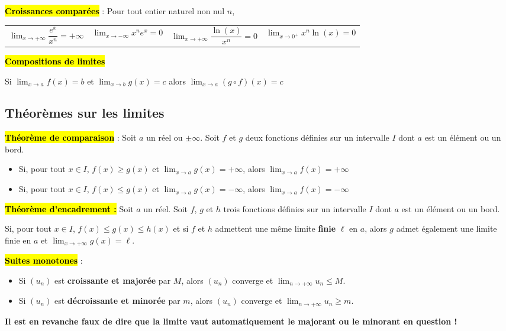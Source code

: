 \documentclass[10pt,fleqn, openany, landscape, twocolumn]{book} %
\begin{document}
\hl{\textbf{Croissances comparées}} : Pour tout entier naturel non nul $n$,

\begin{tabularx}{\linewidth}{XXXX}
$\displaystyle\lim_{x\to + \infty}\dfrac{e^x}{x^n}=+\infty$ & $\displaystyle\lim_{x\to - \infty}x^ne^x=0$ & $\displaystyle\lim_{x\to + \infty}\dfrac{\ln(x)}{x^n}=0$ & $\displaystyle\lim_{x\to 0^+} x^n \ln(x)=0$
\end{tabularx}

\hl{\textbf{Compositions de limites}}

Si $\displaystyle\lim_{x\to a}f(x)=b$ et $\displaystyle\lim_{x\to b}g(x)=c$ alors $\displaystyle\lim_{x \to a}(g\circ f)(x)=c$

\subsection*{Théorèmes sur les limites}

\hl{\textbf{Théorème de comparaison}} : Soit $a$ un réel ou $\pm \infty$. Soit $f$ et $g$ deux fonctions définies sur un intervalle $I$ dont $a$ est un élément ou un bord.
\begin{itemize}
\item Si, pour tout $x\in I$, $f(x)\geqslant g(x)$ et $\displaystyle \lim_{x \to a} g(x)=+\infty$, alors $\displaystyle \lim_{x \to a} f(x)=+\infty$
\item Si, pour tout $x\in I$, $f(x)\leqslant g(x)$ et $\displaystyle \lim_{x \to a} g(x)=-\infty$, alors $\displaystyle \lim_{x \to a} f(x)=-\infty$
\end{itemize}

\hl{\textbf{Théorème d'encadrement :}} Soit $a$ un réel. Soit $f$, $g$ et $h$ trois fonctions définies sur un intervalle $I$ dont $a$ est un élément ou un bord.

Si, pour tout $x\in I$, $f(x)\leqslant g(x)\leqslant h(x)$ et si $f$ et $h$ admettent une même limite \textbf{finie} $\ell$ en $a$, alors $g$ admet également une limite finie en $a$ et $\displaystyle \lim_{x \to +\infty} g(x)=\ell$.

\hl{\textbf{Suites monotones}} : 
\begin{itemize}
\item Si $(u_n)$ est \textbf{croissante et majorée} par $M$, alors $(u_n)$ converge et $\displaystyle\lim_{n \to +\infty}u_n\leqslant M$.
\item Si $(u_n)$ est \textbf{décroissante et minorée} par $m$, alors $(u_n)$ converge et $\displaystyle\lim_{n \to +\infty}u_n\geqslant m$.
\end{itemize}
\textbf{Il est en revanche faux de dire que la limite vaut automatiquement le majorant ou le minorant en question ! }
\end{document}
